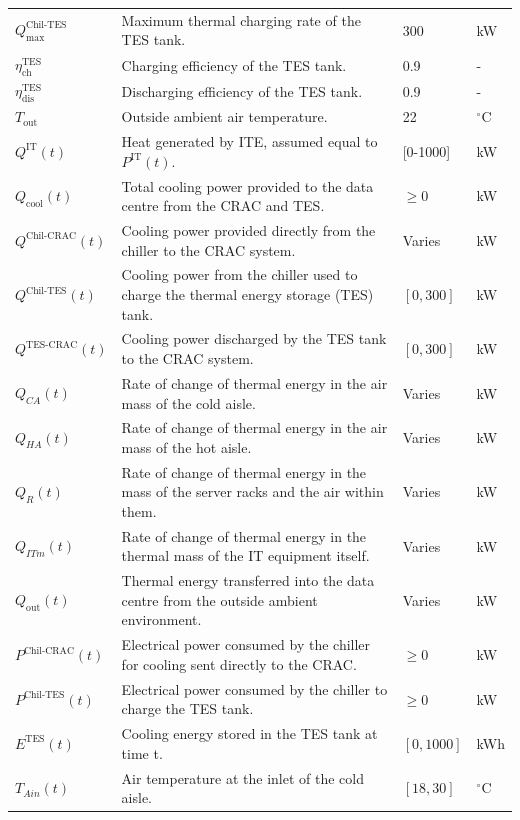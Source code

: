 \documentclass[lettersize,journal]{IEEEtran}
\begin{document}
{{\begin{longtable}{p{} p{} p{} p{}}
$Q^{\mathrm{Chil}\text{-}\mathrm{TES}}_{\mathrm{max}}$ & Maximum thermal charging rate of the TES tank. & 300 &kW \\
$\eta^{\mathrm{TES}}_{\mathrm{ch}}$ & Charging efficiency of the TES tank. & 0.9 & - \\
$\eta^{\mathrm{TES}}_{\mathrm{dis}}$ & Discharging efficiency of the TES tank. & 0.9 & - \\
$T_{\mathrm{out}}$ & Outside ambient air temperature. & 22 & $^{\circ}$C \\
$Q^{\mathrm{IT}}(t)$ & Heat generated by ITE, assumed equal to $P^{\mathrm{IT}}(t)$. & [0-1000] &kW \\
$Q_{\mathrm{cool}}(t)$ & Total cooling power provided to the data centre from the CRAC and TES. & $\geq 0$ &kW \\
$Q^{\mathrm{Chil}\text{-}\mathrm{CRAC}}(t)$ & Cooling power provided directly from the chiller to the CRAC system. & Varies &kW \\
$Q^{\mathrm{Chil}\text{-}\mathrm{TES}}(t)$ & Cooling power from the chiller used to charge the thermal energy storage (TES) tank. & $[0, 300]$ &kW \\
$Q^{\mathrm{TES}\text{-}\mathrm{CRAC}}(t)$ & Cooling power discharged by the TES tank to the CRAC system. & $[0, 300]$ &kW \\
$Q_{CA}(t)$ & Rate of change of thermal energy in the air mass of the cold aisle. & Varies &kW \\
$Q_{HA}(t)$ & Rate of change of thermal energy in the air mass of the hot aisle. & Varies &kW \\
$Q_{R}(t)$ & Rate of change of thermal energy in the mass of the server racks and the air within them. & Varies &kW \\
$Q_{ITm}(t)$ & Rate of change of thermal energy in the thermal mass of the IT equipment itself. & Varies &kW \\
$Q_{\mathrm{out}}(t)$ & Thermal energy transferred into the data centre from the outside ambient environment. & Varies &kW \\
$P^{\mathrm{Chil}\text{-}\mathrm{CRAC}}(t)$ & Electrical power consumed by the chiller for cooling sent directly to the CRAC. & $\geq 0$ &kW \\
$P^{\mathrm{Chil}\text{-}\mathrm{TES}}(t)$ & Electrical power consumed by the chiller to charge the TES tank. & $\geq 0$ &kW \\
$E^{\mathrm{TES}}(t)$ & Cooling energy stored in the TES tank at time t. & $[0, 1000]$ &kWh \\
$T_{Ain}(t)$ & Air temperature at the inlet of the cold aisle. & $[18, 30]$ & $^{\circ}$C \\

\end{longtable}}}
\end{document}
